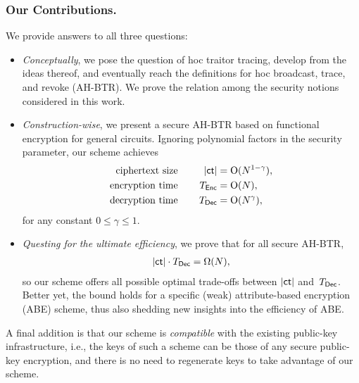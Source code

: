 \subsubsection{Our Contributions.}
We provide answers to all three questions:
\begin{itemize}
\item \emph{Conceptually}, we pose the question of \ad hoc traitor tracing,
develop from the ideas thereof, and
eventually reach the definitions for \ad hoc broadcast, trace, and revoke (AH-BTR).
We prove the relation among the security notions considered in this work.
\item \emph{Construction-wise},
we present a secure AH-BTR based on functional encryption for general circuits.
Ignoring polynomial factors in the security parameter,
our scheme achieves
\begin{align*}
\textup{ciphertext size}\qquad\qquad\mathllap{|\ct|}&{}=\bigO(N^{1-\gamma}),\\
\textup{encryption time}\qquad\qquad\mathllap{T_\Enc}&{}=\bigO(N),\\
\textup{decryption time}\qquad\qquad\mathllap{T_\Dec}&{}=\bigO(N^\gamma),
\end{align*}
for any constant ${0\leq\gamma\leq 1}$.
\item \emph{Questing for the ultimate efficiency},
we prove that for all secure AH-BTR,
\begin{align*}
|\ct|\cdot\TDec=\bigOmega(N),
\end{align*}
so our scheme offers all possible optimal trade-offs between $|\ct|$ and~$\TDec$.
Better yet, the bound holds for a specific (weak) attribute-based encryption (ABE) scheme, thus also shedding new insights into the efficiency of ABE.
\end{itemize}
A final addition is that our scheme is \emph{compatible} with the existing public-key infrastructure,
i.e., the keys of such a scheme can be those of any secure public-key encryption, and
there is no need to regenerate keys to take advantage of our scheme.
